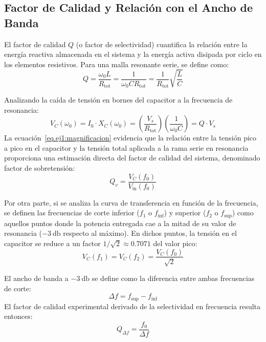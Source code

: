 \subsection{Factor de Calidad y Relación con el Ancho de Banda}
El factor de calidad $Q$ (o factor de selectividad) cuantifica la relación entre la energía reactiva almacenada en el
sistema y la energía activa disipada por ciclo en los elementos resistivos. Para una malla resonante serie, se define
como:
\begin{equation}
    Q = \frac{\omega_0 L}{R_{\text{tot}}} = \frac{1}{\omega_0 C R_{\text{tot}}} = \frac{1}{R_{\text{tot}}} \sqrt{\frac{L}{C}}
    \label{eq.ej1:q_definicion}
\end{equation}

Analizando la caída de tensión en bornes del capacitor a la frecuencia de resonancia:
\begin{equation}
    V_C(\omega_0) = I_0 \cdot X_C(\omega_0) = \left( \frac{V_s}{R_{\text{tot}}} \right) \left( \frac{1}{\omega_0 C} \right) = Q \cdot V_s
    \label{eq.ej1:magnificacion}
\end{equation}
La ecuación~\eqref{eq.ej1:magnificacion} evidencia que la relación entre la tensión pico a pico en el capacitor y la
tensión total aplicada a la rama serie en resonancia proporciona una estimación directa del factor de calidad del
sistema, denominado factor de sobretensión:
\begin{equation}
    Q_v = \frac{V_C(f_0)}{V_{\text{in}}(f_0)}
    \label{eq.ej1:qv}
\end{equation}

Por otra parte, si se analiza la curva de transferencia en función de la frecuencia, se definen las frecuencias de
corte inferior ($f_1$ o $f_{\text{inf}}$) y superior ($f_2$ o $f_{\text{sup}}$) como aquellos puntos donde la potencia
entregada cae a la mitad de su valor de resonancia ($\qty{-3}{\decibel}$ respecto al máximo). En dichos puntos, la
tensión en el capacitor se reduce a un factor $1/\sqrt{2} \approx 0.7071$ del valor pico:
\begin{equation}
    V_C(f_1) = V_C(f_2) = \frac{V_C(f_0)}{\sqrt{2}}
    \label{eq.ej1:umbral_3db}
\end{equation}

El ancho de banda a $\qty{-3}{\decibel}$ se define como la diferencia entre ambas frecuencias de corte:
\begin{equation}
    \Delta f = f_{\text{sup}} - f_{\text{inf}}
    \label{eq.ej1:bw}
\end{equation}
El factor de calidad experimental derivado de la selectividad en frecuencia resulta entonces:
\begin{equation}
    Q_{\Delta f} = \frac{f_0}{\Delta f}
    \label{eq.ej1:q_bw}
\end{equation}

